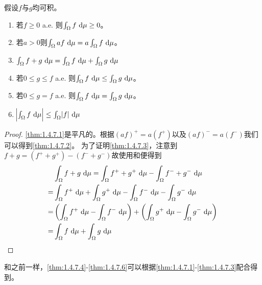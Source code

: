 \documentclass[../main.tex]{subfiles}
\begin{document}
\begin{theorem} \label{thm:1.4.7}
	假设\(f\)与\(g\)均可积。
	\begin{enumerate}
		\item\label{thm:1.4.7.1}若\(f\geq0\) a.e. 则\(\int_\Omega f\,\dif\mu\geq0\)。
		\item\label{thm:1.4.7.2} 若\(a>0\)则\(\int_\Omega af\,\dif\mu=a\int_\Omega f\,\dif\mu\)。
		\item\label{thm:1.4.7.3} \(\int_\Omega f+g\,\dif\mu=\int_\Omega f\,\dif\mu+\int_\Omega g\,\dif\mu\)
		\item\label{thm:1.4.7.4} 若\(0\leq g\leq f\) a.e. 则\(\int_\Omega f\,\dif\mu\leq\int_\Omega g\,\dif\mu\)。
		\item\label{thm:1.4.7.5} 若\(0\leq g= f\) a.e. 则\(\int_\Omega f\,\dif\mu=\int_\Omega g\,\dif\mu\)。
		\item\label{thm:1.4.7.6} \(\envert{\int_\Omega f\,\dif\mu}\leq\int_\Omega \envert{f}\,\dif\mu\)
	\end{enumerate}
\end{theorem}
\begin{proof}
	\ref{thm:1.4.7.1}是平凡的。根据\((af)^+=a(f^+)\)以及\((af)^-=a(f^-)\)我们可以得到\ref{thm:1.4.7.2}。
	为了证明\ref{thm:1.4.7.3}，注意到\(f+g=(f^++g^+)-(f^-+g^-)\)故使用和便得到
	\begin{align*}
		&\int_\Omega f+g\,\dif\mu=\int_\Omega f^++g^+\,\dif\mu-\int_\Omega f^-+g^-\,\dif\mu\\
		=&\int_\Omega f^+\,\dif\mu+\int_\Omega g^+\,\dif\mu-\int_\Omega f^-\,\dif\mu-\int_\Omega g^-\,\dif\mu\\
		=&\del{\int_\Omega f^+\,\dif\mu-\int_\Omega f^-\,\dif\mu}+\del{\int_\Omega g^+\,\dif\mu-\int_\Omega g^-\,\dif\mu}\\
		=&\int_\Omega f\,\dif\mu+\int_\Omega g\,\dif\mu
	\end{align*}
\end{proof}
和之前一样，\ref{thm:1.4.7.4}-\ref{thm:1.4.7.6}可以根据\ref{thm:1.4.7.1}-\ref{thm:1.4.7.3}配合得到。
\end{document}
